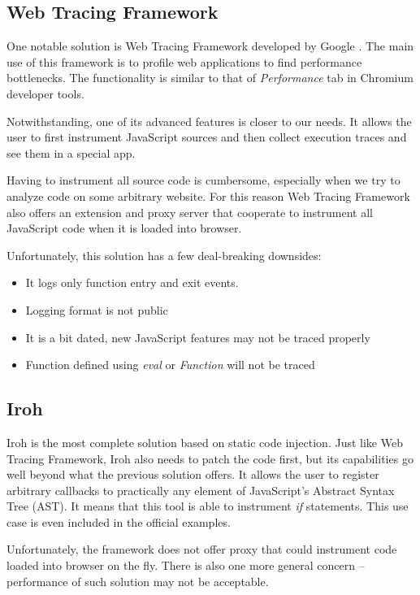\subsection{Web Tracing Framework}
One notable solution is Web Tracing Framework developed by Google \cite{google:wtf}.
The main use of this framework is to profile web applications to find performance bottlenecks.
The functionality is similar to that of \emph{Performance} tab in Chromium developer tools.

Notwithstanding, one of its advanced features is closer to our needs. 
It allows the user to first instrument JavaScript sources and then 
collect execution traces and see them in a special app.

Having to instrument all source code is cumbersome, especially when we try to analyze code on some
arbitrary website. For this reason Web Tracing Framework also offers an extension and proxy server 
that cooperate to instrument all JavaScript code when it is loaded into browser.

Unfortunately, this solution has a few deal-breaking downsides:
\begin{itemize}
  \item It logs only function entry and exit events.
  \item Logging format is not public
  \item It is a bit dated, new JavaScript features may not be traced properly
  \item Function defined using \emph{eval} or \emph{Function} will not be traced
\end{itemize}

\subsection{Iroh}
Iroh \cite{iroh} is the most complete solution based on static code injection.
Just like Web Tracing Framework, Iroh also needs to patch the code first, but its capabilities go well
beyond what the previous solution offers. It allows the user to register arbitrary callbacks to practically any
element of JavaScript's Abstract Syntax Tree (AST). It means that this tool is able to instrument \emph{if} statements.
This use case is even included in the official examples.

Unfortunately, the framework does not offer proxy that could instrument code loaded into browser on the fly.
There is also one more general concern -- performance of such solution may not be acceptable.

